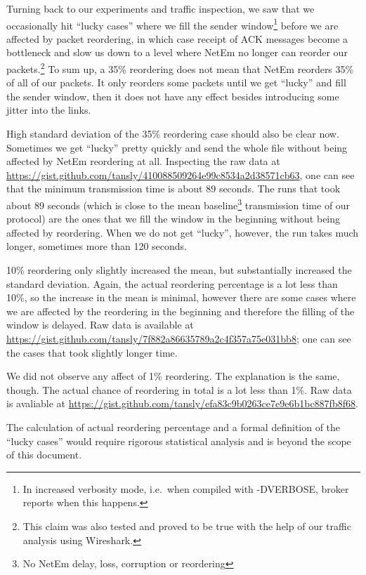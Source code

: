 \documentclass[conference]{IEEEtran}
\begin{document}
Turning back to our experiments and traffic inspection, we saw that we occasionally
hit ``lucky cases'' where we fill the sender window\footnote{In increased verbosity mode,
i.e.\ when compiled with -DVERBOSE, broker reports when this happens.}
before we are affected by packet reordering, in which case receipt of ACK
messages become a bottleneck and slow us down to a level where NetEm no longer
can reorder our packets.\footnote{This claim was also tested and proved to be true with the help
of our traffic analysis using Wireshark.} To sum up, a 35\% reordering does not
mean that NetEm reorders 35\% of all of our packets. It only reorders some packets
until we get ``lucky'' and fill the sender window, then it does not have any effect
besides introducing some jitter into the links.

High standard deviation of the
35\% reordering case should also be clear now. Sometimes we get ``lucky'' pretty quickly
and send the whole file without being affected by NetEm reordering at all. Inspecting the raw
data at \url{https://gist.github.com/tansly/410088509264e99c8534a2d38571cb63}, one can see that
the minimum transmission time is about 89 seconds.
The runs that took about 89 seconds (which is close to the mean baseline\footnote{No NetEm delay, loss, corruption or reordering}
transmission time of our protocol) are the ones that we fill the window in the beginning without
being affected by reordering. When we do not get ``lucky'', however, the run takes much longer,
sometimes more than 120 seconds.

10\% reordering only slightly increased the mean, but substantially increased the standard deviation.
Again, the actual reordering percentage is a lot less than 10\%, so the increase in the
mean is minimal, however there are some cases where we are affected by the reordering
in the beginning and therefore the filling of the window is delayed. Raw data
is available at \url{https://gist.github.com/tansly/7f882a86635789a2c4f357a75e031bb8};
one can see the cases that took slightly longer time.

We did not observe any affect of 1\% reordering. The explanation is the same, though.
The actual chance of reordering in total is a lot less than 1\%. Raw data is avaliable at
\url{https://gist.github.com/tansly/efa83c9b0263ce7e9e6b1bc887fb8f68}.

The calculation of actual reordering percentage and a formal definition of the
``lucky cases'' would require rigorous statistical analysis and is beyond the scope
of this document.
\end{document}
